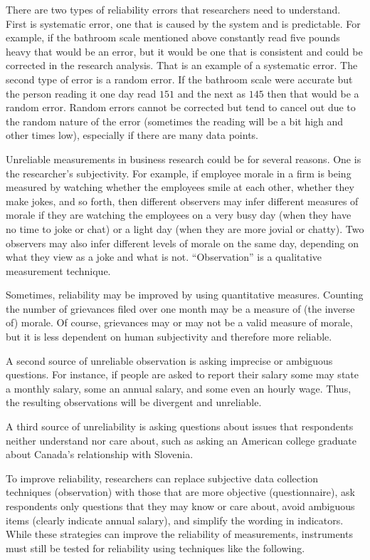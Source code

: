 There are two types of reliability errors that researchers need to understand. First is systematic error, one that is caused by the system and is predictable. For example, if the bathroom scale mentioned above constantly read five pounds heavy that would be an error, but it would be one that is consistent and could be corrected in the research analysis. That is an example of a systematic error. The second type of error is a random error. If the bathroom scale were accurate but the person reading it one day read $ 151 $ and the next as $ 145 $ then that would be a random error. Random errors cannot be corrected but tend to cancel out due to the random nature of the error (sometimes the reading will be a bit high and other times low), especially if there are many data points.

Unreliable measurements in business research could be for several reasons. One is the researcher's subjectivity. For example, if employee morale in a firm is being measured by watching whether the employees smile at each other, whether they make jokes, and so forth, then different observers may infer different measures of morale if they are watching the employees on a very busy day (when they have no time to joke or chat) or a light day (when they are more jovial or chatty). Two observers may also infer different levels of morale on the same day, depending on what they view as a joke and what is not. ``Observation'' is a qualitative measurement technique. 

Sometimes, reliability may be improved by using quantitative measures. Counting the number of grievances filed over one month may be a measure of (the inverse of) morale. Of course, grievances may or may not be a valid measure of morale, but it is less dependent on human subjectivity and therefore more reliable. 

A second source of unreliable observation is asking imprecise or ambiguous questions. For instance, if people are asked to report their salary some may state a monthly salary, some an annual salary, and some even an hourly wage. Thus, the resulting observations will be divergent and unreliable. 

A third source of unreliability is asking questions about issues that respondents neither understand nor care about, such as asking an American college graduate about Canada's relationship with Slovenia.

To improve reliability, researchers can replace subjective data collection techniques (observation) with those that are more objective (questionnaire), ask respondents only questions that they may know or care about, avoid ambiguous items (\eg clearly indicate annual salary), and simplify the wording in indicators. While these strategies can improve the reliability of measurements, instruments must still be tested for reliability using techniques like the following.

